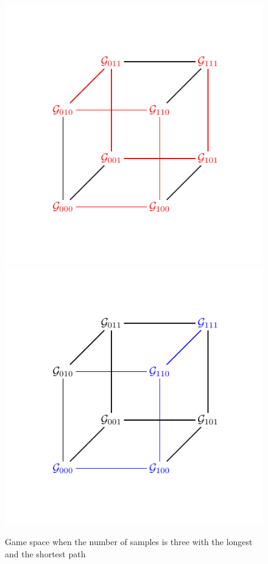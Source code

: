 \documentclass{crypto-exercise}
\begin{document}
\begin{solution}
\begin{figure}[H]
\begin{center}
\includegraphics[scale=0.8]{./figures/0306-hypercube-i}
\includegraphics[scale=0.8]{./figures/0306-hypercube-ii}
\end{center}
\caption{Game space when the number of samples is three with the longest and the shortest path}
\label{fig:hyper-cube}
\end{figure}


\end{solution}
\end{document}
